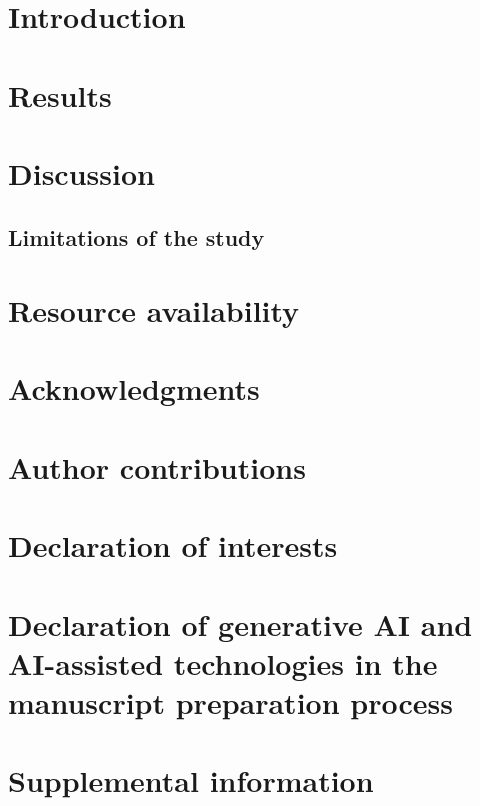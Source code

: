 \documentclass[\cellsize, letterpaper]{article}
\begin{document}





\clearpage

\section{Introduction}


\section{Results}


\section{Discussion}


\subsection{Limitations of the study}


\section{Resource availability}


\section{Acknowledgments}


\section{Author contributions}


\section{Declaration of interests}


\section{Declaration of generative AI and AI-assisted technologies in the manuscript preparation process}


\section{Supplemental information}

\end{document}
